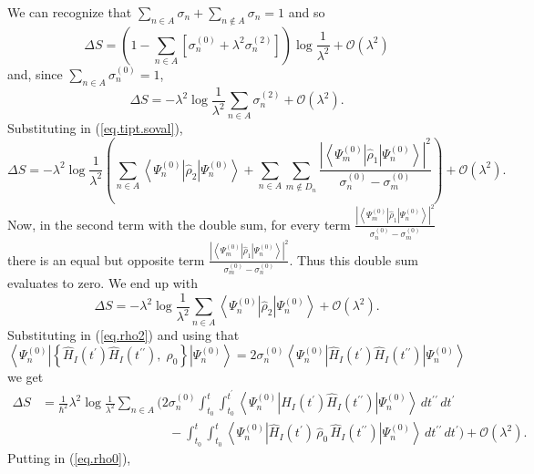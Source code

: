 \documentclass[11pt]{article}
\newcommand{\Od}[1]{\mathcal{O}{\left(#1\right)}}
\newcommand{\bra}[1]{\left\langle#1\right|}
\newcommand{\ket}[1]{\left|#1\right\rangle}
\newcommand{\op}[1]{\hat{#1}}
\theoremstyle{theorem}
\theoremstyle{remark}
\theoremstyle{step}
\theoremstyle{gap}
\begin{document}
We can recognize that \(\sum_{n\in A} \sigma_n + \sum_{n \not\in A} \sigma_n = 1\) and so
\[
\Delta S = \left(1- \sum_{n\in A} \left[\sigma_n^{(0)}+\lambda^2 \sigma_n^{(2)}\right]\right)\log\frac{1}{\lambda^2} + \Od{\lambda^2}
\]
and, since \(\sum_{n \in A} \sigma_n^{(0)} = 1\),
\begin{equation}\label{eq.entropyresultwithsigma2}
{\Delta S = -\lambda^2 \log\frac{1}{\lambda^2}\sum_{n \in A} \sigma_n^{(2)} + \Od{\lambda^2}.}
\end{equation}
Substituting in (\ref{eq.tipt.soval}),
\[
\Delta S = -\lambda^2 \log\frac{1}{\lambda^2}\left(\sum_{n \in A} \bra{\Psi_n^{(0)}}\op{\rho}_2\ket{\Psi_n^{(0)}} +  \sum_{n \in A} \sum_{m \not\in D_n} \frac{\left|\bra{\Psi_m^{(0)}} \op{\rho}_1 \ket{\Psi_n^{(0)}}\right|^2}{\sigma_n^{(0)}-\sigma_m^{(0)}} \right)+ \Od{\lambda^2}.
\]
Now, in the second term with the double sum, for every term \(\frac{\left|\bra{\Psi_m^{(0)}} \op{\rho}_1 \ket{\Psi_n^{(0)}}\right|^2}{\sigma_n^{(0)}-\sigma_m^{(0)}}\) there is an equal but opposite term \(\frac{\left|\bra{\Psi_m^{(0)}} \op{\rho}_1 \ket{\Psi_n^{(0)}}\right|^2}{\sigma_m^{(0)}-\sigma_n^{(0)}}\). Thus this double sum evaluates to zero. We end up with
\begin{equation}\label{eq.entropyresultwithrho2}
\boxed{\Delta S = -\lambda^2 \log\frac{1}{\lambda^2}\sum_{n \in A} \bra{\Psi_n^{(0)}}\op{\rho}_2\ket{\Psi_n^{(0)}} + \Od{\lambda^2}.}
\end{equation}
Substituting in (\ref{eq.rho2}) and using that
\[
\bra{\Psi_n^{(0)}} \left\{ \op{H}_I (t^\prime) \op{H}_I(t^{\prime\prime}),\; \op{\rho}_0 \right\} \ket{\Psi_n^{(0)}} = 2 \sigma_n^{(0)} \bra{\Psi_n^{(0)}} \op{H}_I (t^\prime) \op{H}_I(t^{\prime\prime}) \ket{\Psi_n^{(0)}}
\]
we get
\begin{align}\label{entropyresultwithHI}
\Delta S &= \frac{1}{\hbar^2}\lambda^2 \log\frac{1}{\lambda^2}\sum_{n \in A} \Bigg(2 \sigma_n^{(0)} \int_{t_0}^t \int_{t_0}^{t^\prime} \bra{\Psi_n^{(0)}} \op{H}_I (t^\prime) \op{H}_I(t^{\prime\prime}) \ket{\Psi_n^{(0)}}\,dt^{\prime\prime}\,dt^\prime \\
&\hspace{10em}- \int_{t_0}^t \int_{t_0}^{t} \bra{\Psi_n^{(0)}}\op{H}_I (t^\prime) \,\op{\rho}_0\, \op{H}_I (t^{\prime\prime})\ket{\Psi_n^{(0)}}\,dt^{\prime\prime}\,dt^\prime \Bigg) + \Od{\lambda^2}.\nonumber
\end{align}
Putting in (\ref{eq.rho0}),
\end{document}

